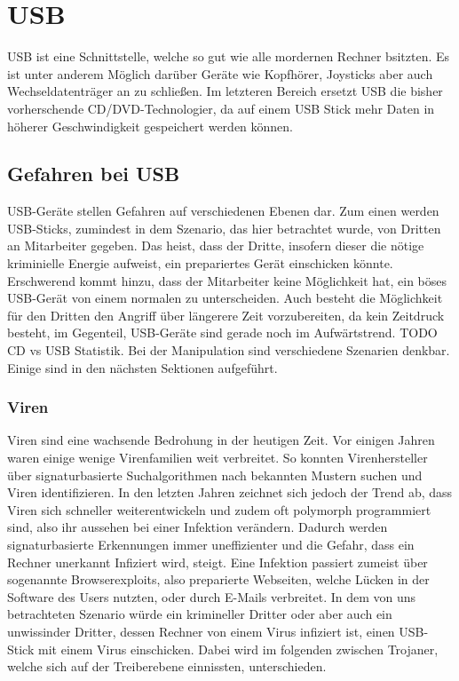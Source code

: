 \chapter{USB}
USB ist eine Schnittstelle, welche so gut wie alle mordernen Rechner bsitzten. Es ist unter anderem Möglich darüber Geräte wie Kopfhörer, Joysticks aber auch Wechseldatenträger an zu schließen. Im letzteren Bereich ersetzt USB die bisher vorherschende CD/DVD-Technologier, da auf einem USB Stick mehr Daten in höherer Geschwindigkeit gespeichert werden können.
\section{Gefahren bei USB}\label{GefBeiUSB}
USB-Geräte stellen Gefahren auf verschiedenen Ebenen dar. Zum einen werden USB-Sticks, zumindest in dem Szenario, das hier betrachtet wurde, von Dritten an Mitarbeiter gegeben. Das heist, dass der Dritte, insofern dieser die nötige kriminielle Energie aufweist, ein prepariertes Gerät einschicken könnte. Erschwerend kommt hinzu, dass der Mitarbeiter keine Möglichkeit hat, ein böses USB-Gerät von einem normalen zu unterscheiden. Auch besteht die Möglichkeit für den Dritten den Angriff über längerere Zeit vorzubereiten, da kein Zeitdruck besteht, im Gegenteil, USB-Geräte sind gerade noch im Aufwärtstrend. TODO CD vs USB Statistik. Bei der Manipulation sind verschiedene Szenarien denkbar. Einige sind in den nächsten Sektionen aufgeführt.

			\subsection{Viren}
Viren sind eine wachsende Bedrohung in der heutigen Zeit. Vor einigen Jahren waren einige wenige Virenfamilien weit verbreitet. So konnten Virenhersteller über signaturbasierte Suchalgorithmen nach bekannten Mustern suchen und Viren identifizieren. In den letzten Jahren zeichnet sich jedoch der Trend ab, dass Viren sich schneller weiterentwickeln und zudem oft polymorph programmiert sind, also ihr aussehen bei einer Infektion verändern. Dadurch werden signaturbasierte Erkennungen immer uneffizienter und die Gefahr, dass ein Rechner unerkannt Infiziert wird, steigt. Eine Infektion passiert zumeist über sogenannte Browserexploits, also preparierte Webseiten, welche Lücken in der Software des Users nutzten, oder durch E-Mails verbreitet. In dem von uns betrachteten Szenario würde ein krimineller Dritter oder aber auch ein unwissinder Dritter, dessen Rechner von einem Virus infiziert ist, einen USB-Stick mit einem Virus einschicken. Dabei wird im folgenden zwischen Trojaner, welche sich auf der Treiberebene einnissten, unterschieden.

